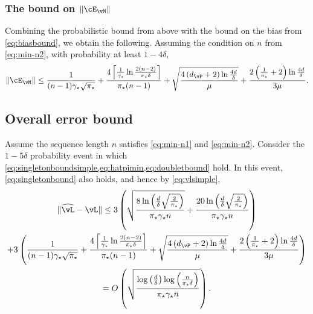 \subsubsection{The bound on $\norm{\errm}$}
Combining the probabilistic bound from above with the bound on the
bias from \cref{eq:biasbound}, we obtain the following.
Assuming the condition on $n$ from \cref{eq:min-n2}, with probability
at least $1-4\delta$,
\begin{equation}
  \norm{\errm}
  \leq
  \frac{1}{(n-1)\gap\sqrt{\pimin}}
  +
  \frac{4
    \Ceil{
      \frac{1}{\gap}\ln\frac{2(n-2)}{\pimin\delta}
    }
  }{\pimin(n-1)}
  +
  \sqrt{
    \frac{4\Parens{ d_{\vP} + 2 } \ln\frac{4d}{\delta}}
    {\mu}
  }
  + \frac{2\Parens{ \frac1{\pimin} + 2 } \ln\frac{4d}{\delta}}
  {3\mu}
  .
  \label{eq:doubletbound}
\end{equation}

\subsection{Overall error bound}
Assume the sequence length $n$ satisfies \cref{eq:min-n1} and
\cref{eq:min-n2}.
Consider the $1-5\delta$ probability event in which
\cref{eq:singletonboundsimple,eq:hatpimin,eq:doubletbound} hold.
In this event, \cref{eq:singletonbound} also holds, and hence by
\cref{eq:vlsimple},
\begin{multline*}
  \norm{\wh\vL - \vL}
  \leq
  3
  \Parens{
    \sqrt{
      \frac{
        8\ln\Parens{\frac{d}\delta\sqrt{\frac{2}{\pimin}}}
      }{
        \pimin\gap n
      }
    }
    +
    \frac{
      20\ln\Parens{\frac{d}\delta\sqrt{\frac{2}{\pimin}}}
    }{
      \pimin\gap n
    }
  }
  \\
  +
  3\Parens{
    \frac{1}{(n-1)\gap\sqrt{\pimin}}
    +
    \frac{4
      \Ceil{
        \frac{1}{\gap}\ln\frac{2(n-2)}{\pimin\delta}
      }
    }{\pimin(n-1)}
    +
    \sqrt{
      \frac{4\Parens{ d_{\vP} + 2 } \ln\frac{4d}{\delta}}
      {\mu}
    }
    + \frac{2\Parens{ \frac1{\pimin} + 2 } \ln\frac{4d}{\delta}}
    {3\mu}
  }
  \\
  =
  O
  \Parens{
    \sqrt{
      \frac{
        \log\Parens{\frac{d}{\delta}}
        \log\Parens{\frac{n}{\pimin\delta}}
      }{\pimin\gap n}
    }
  }
  .
\end{multline*}


